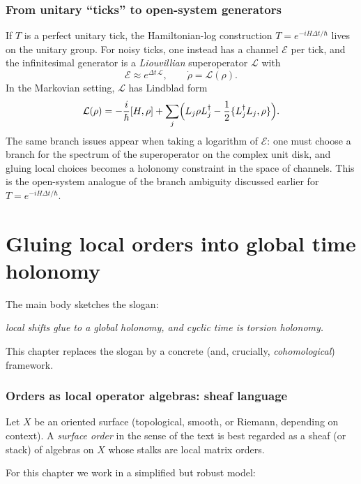 \documentclass[11pt,oneside]{amsbook}
\numberwithin{equation}{section}
\theoremstyle{plain}
\theoremstyle{definition}
\theoremstyle{remark}
\begin{document}
\subsection{From unitary ``ticks'' to open-system generators}
If $T$ is a perfect unitary tick, the Hamiltonian-log construction $T=e^{-iH\Delta t/\hbar}$ lives on the unitary group.
For noisy ticks, one instead has a channel $\mathcal{E}$ per tick, and the infinitesimal generator is a \emph{Liouvillian} superoperator $\mathcal{L}$ with
\[
\mathcal{E}\approx e^{\Delta t\,\mathcal{L}},\qquad
\dot\rho = \mathcal{L}(\rho).
\]
In the Markovian setting, $\mathcal{L}$ has Lindblad form
\begin{equation}
\label{eq:lindblad_form}
\mathcal{L}(\rho)
= -\frac{i}{\hbar}[H,\rho]
+ \sum_j\Bigl(L_j\rho L_j^\dagger-\frac12\{L_j^\dagger L_j,\rho\}\Bigr).
\end{equation}
The same branch issues appear when taking a logarithm of $\mathcal{E}$: one must choose a branch for the spectrum of the superoperator on the complex unit disk, and gluing local choices becomes a holonomy constraint in the space of channels.
This is the open-system analogue of the branch ambiguity discussed earlier for $T=e^{-iH\Delta t/\hbar}$.

\chapter{Gluing local orders into global time holonomy}

\label{ch:gluing}


The main body sketches the slogan:
\begin{center}
\emph{local shifts glue to a global holonomy, and cyclic time is torsion holonomy.}
\end{center}
This chapter replaces the slogan by a concrete (and, crucially, \emph{cohomological}) framework.

\subsection{Orders as local operator algebras: sheaf language}
\label{sec:sheaf_orders}

Let $X$ be an oriented surface (topological, smooth, or Riemann, depending on context).
A \emph{surface order} in the sense of the  text is best regarded as a sheaf (or stack) of algebras on $X$ whose stalks are local matrix orders.

For this chapter we work in a simplified but robust model:
\end{document}

